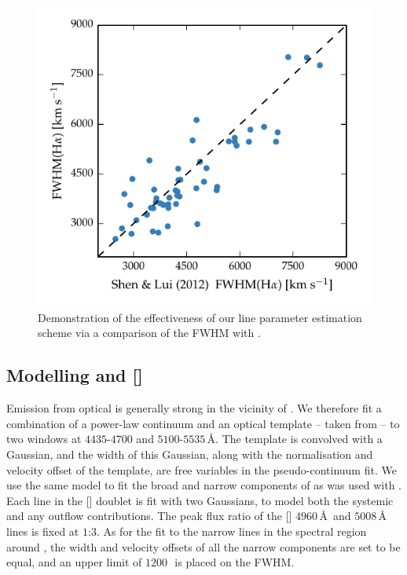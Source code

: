 \begin{figure}
    \centering 
    \includegraphics[width=0.8\linewidth]{figures/chapter03/shen_comparison_ha.pdf} 
    \caption[{Demonstration of the effectiveness of \ha line parameter estimation scheme.}]{Demonstration of the effectiveness of our line parameter estimation scheme via a comparison of the \ha FWHM with \citet{shen12}.} 
    \label{fig:shen_comparison_ha}
\end{figure}

\subsection{Modelling \hb and []}
\label{sec:hb}

Emission from optical  is generally strong in the vicinity of \hbns.
We therefore fit a combination of a power-law continuum and an optical  template -- taken from \citet{boroson92} -- to two windows at $4435$-$4700$ and $5100$-$5535$\,\AA. 
The  template is convolved with a Gaussian, and the width of this Gaussian, along with the normalisation and velocity offset of the  template, are free variables in the pseudo-continuum fit.
We use the same model to fit the broad and narrow components of \hb as was used with \hans. 
Each line in the [] doublet is fit with two Gaussians, to model both the systemic and any outflow contributions. 
The peak flux ratio of the [] $4960$\,\AA\, and $5008$\,\AA\, lines is fixed at $1$:$3$. 
As for the fit to the narrow lines in the spectral region around \hans, the width and velocity offsets of all the narrow components are set to be equal, and an upper limit of $1200$\,\kms\, is placed on the FWHM. 

